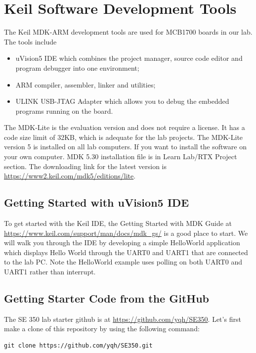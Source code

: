 \chapter{Keil Software Development Tools}
\label{ch_keil_software}

The Keil MDK-ARM development tools are used for MCB1700 boards in our lab.
The tools include
\begin{itemize}
\item uVision5 IDE which combines the project manager, source code editor and program debugger into one environment; 
\item ARM compiler, assembler, linker and utilities;
\item ULINK USB-JTAG Adapter which allows you to debug the embedded programs running on the board.
\end{itemize}

The MDK-Lite is the evaluation version and does not require a license. 
It has a code size limit of 32KB, which is adequate for the lab projects.
The MDK-Lite version 5 is installed on all lab computers. 
If you want to install the software on your own computer. MDK 5.30 installation file is in Learn Lab/RTX Project section. The downloading link for the latest version is \url{https://www2.keil.com/mdk5/editions/lite}. 

\section{Getting Started with uVision5 IDE}
To get started with the Keil IDE, the Getting Started with MDK Guide at
\url{https://www.keil.com/support/man/docs/mdk_gs/} 
is a good place to start. We will walk you through the IDE by developing
a simple HelloWorld application which displays Hello World through the UART0 and UART1
that are connected to the lab PC. Note the HelloWorld example uses polling on both UART0 and UART1 rather than interrupt. 

\section{Getting Starter Code from the GitHub}
The SE 350 lab starter github is at \url{https://github.com/yqh/SE350}. Let's first make a clone of this repository by using the following command:
\begin{lstlisting}[style=bash]
 git clone https://github.com/yqh/SE350.git 
\end{lstlisting}

